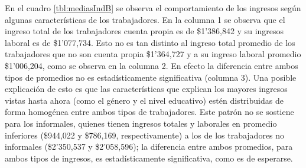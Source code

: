 \documentclass[11pt,a4paper]{article}
\begin{document}
      En el cuadro \ref{tbl:mediasIndB} se observa el comportamiento de los ingresos según algunas características de los trabajadores. En la columna 1 se observa que el ingreso total de los trabajadores cuenta propia
      es de \$1'386,842 y su ingresos laboral es de \$1'077,734. Esto no es tan distinto al ingreso total promedio de los trabajadores que no son cuenta propia \$1'364,727 y a su ingreso laboral promedio \$1'006,204, como se observa en la columna 2.
      En efecto la diferencia entre ambos tipos de promedios no es estadísticamente significativa (columna 3). Una posible explicación de esto es que las características que explican los mayores ingresos vistas hasta ahora (como el género y el nivel educativo) estén distribuidas de forma homogénea entre ambos tipos de trabajadores.
      Este patrón no se sostiene para los informales, quienes tienen ingresos totales y laborales en promedio inferiores (\$944,022 y \$786,169, respectivamente) a los de los trabajadores no informales (\$2'350,537 y \$2'058,596); la diferencia entre ambos promedios, para ambos tipos de ingresos, es estadísticamente significativa, como es de esperarse. 
\end{document}
